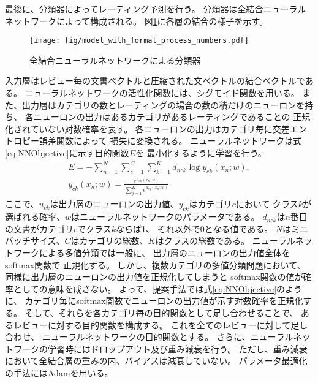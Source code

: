 最後に、分類器によってレーティング予測を行う。
分類器は全結合ニューラルネットワークによって構成される。
図\ref{fig:MyModel}に各層の結合の様子を示す。
\begin{figure}
  \texttt{[image: fig/model\_with\_formal\_process\_numbers.pdf]}
  \caption{全結合ニューラルネットワークによる分類器}
  \label{fig:MyModel}
\end{figure}
入力層はレビュー毎の文書ベクトルと圧縮された文ベクトルの結合ベクトルである。
ニューラルネットワークの活性化関数には、シグモイド関数を用いる。
また、出力層はカテゴリの数とレーティングの場合の数の積だけのニューロンを持ち、
各ニューロンの出力はあるカテゴリがあるレーティングであることの
正規化されていない対数確率を表す。
各ニューロンの出力はカテゴリ毎に交差エントロピー誤差関数によって
損失に変換される。
ニューラルネットワークは式\ref{eq:NNObjective}に示す目的関数$E$を
最小化するように学習を行う。
\begin{gather}
  E = - \sum^{N}_{n = 1} \sum^{C}_{c = 1} \sum^{K}_{k = 1}
        d_{nck} \log{y_{ck}(x_n; w)},
  \label{eq:NNObjective} \\
  y_{ck}(x_n; w) = \frac{e^{u_{ck}(x_n; w)}}
                        {\sum^{K}_{j = 1} e^{u_{cj}(x_n; w)}} \nonumber
\end{gather}
ここで、$u_{ck}$は出力層のニューロンの出力値、$y_{ck}$はカテゴリ$c$において
クラス$k$が選ばれる確率、$w$はニューラルネットワークのパラメータである。
$d_{nck}$は$n$番目の文書がカテゴリ$c$でクラス$k$ならば1、
それ以外で0となる値である。
$N$はミニバッチサイズ、$C$はカテゴリの総数、$K$はクラスの総数である。
ニューラルネットワークによる多値分類では一般に、
出力層のニューロンの出力値全体をsoftmax関数で
正規化する。
しかし、複数カテゴリの多値分類問題において、
同様に出力層のニューロンの出力値を正規化してしまうと
softmax関数の値が確率としての意味を成さない。
よって、提案手法では式\ref{eq:NNObjective}のように、
カテゴリ毎にsoftmax関数でニューロンの出力値が示す対数確率を正規化する。
そして、それらを各カテゴリ毎の目的関数として足し合わせることで、
あるレビューに対する目的関数を構成する。
これを全てのレビューに対して足し合わせ、
ニューラルネットワークの目的関数とする。
さらに、ニューラルネットワークの学習時にはドロップアウト及び重み減衰を行う。
ただし、重み減衰において全結合層の重みの内、バイアスは減衰していない。
パラメータ最適化の手法にはAdam\cite{diederik15}を用いる。
